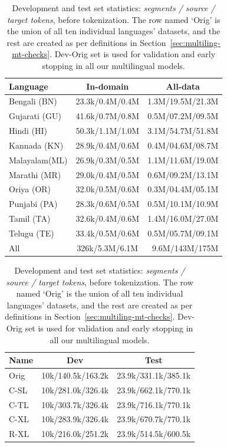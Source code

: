 \renewcommand{\arraystretch}{1.2}
\begin{table}[htb]
    \centering
\begin{tabular}{l @{\hspace{6pt}} c @{\hspace{6pt}} r }
\hline
\textbf{Language} & \textbf{In-domain} & \multicolumn{1}{c}{\textbf{All-data}} \\
\hline
Bengali (BN)  & 23.3k/0.4M/0.4M    & 1.3M/19.5M/21.3M \\
Gujarati (GU) & 41.6k/0.7M/0.8M    & 0.5M/07.2M/09.5M \\
Hindi (HI)    & 50.3k/1.1M/1.0M    & 3.1M/54.7M/51.8M \\
Kannada (KN)  & 28.9k/0.4M/0.6M    & 0.4M/04.6M/08.7M \\
{Malayalam}(ML) & 26.9k/0.3M/0.5M  & 1.1M/11.6M/19.0M \\
Marathi (MR)  & 29.0k/0.4M/0.5M    & 0.6M/09.2M/13.1M \\
Oriya (OR)    & 32.0k/0.5M/0.6M    & 0.3M/04.4M/05.1M \\
Punjabi (PA)  & 28.3k/0.6M/0.5M    & 0.5M/10.1M/10.9M \\
Tamil (TA)    & 32.6k/0.4M/0.6M    & 1.4M/16.0M/27.0M \\
Telugu (TE)   & 33.4k/0.5M/0.6M    & 0.5M/05.7M/09.1M \\
\hdashline
All   & 326k/5.3M/6.1M     & 9.6M/143M/175M\\ 
\hline
\end{tabular} 
    \caption{Training dataset statistics: \textit{segments / source / target tokens}, before tokenization.}
    \label{tab:training-stats}
\vspace{5mm}
    \centering
\begin{tabular}{l c c}
\hline
\textbf{Name} & \textbf{Dev} & \textbf{Test} \\
\hline
Orig & 10k/140.5k/163.2k & 23.9k/331.1k/385.1k \\
C-SL & 10k/281.0k/326.4k & 23.9k/662.1k/770.1k \\
C-TL & 10k/303.7k/326.4k & 23.9k/716.1k/770.1k \\
C-XL & 10k/283.9k/326.4k & 23.9k/670.7k/770.1k \\
R-XL & 10k/216.0k/251.2k & 23.9k/514.5k/600.5k \\
\hline
\end{tabular}
    \caption{Development and test set statistics: \textit{segments / source / target tokens}, before tokenization. 
    The row named `Orig' is the union of all ten individual languages' datasets, and the rest are created as per definitions in Section~\ref{sec:multiling-mt-checks}.
    Dev-Orig set is used for validation and early stopping in all our multilingual models.}
    \label{tab:heldout-stats}
\end{table}


